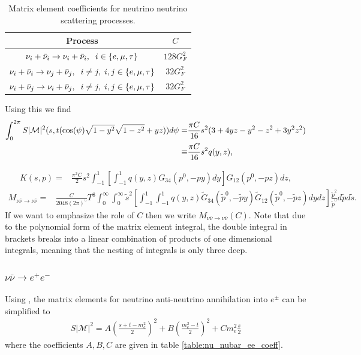 \begin{table}[ht]
\centering 
\begin{tabular}{|c|c|}
\hline
Process &$C$  \\
\hline
$\nu_i+\bar\nu_i\rightarrow\nu_i+\bar\nu_i,\hspace{2mm} i\in\{e,\mu,\tau\}$& $128 G_F^2$\\
\hline
$\nu_i+\bar\nu_i\rightarrow\nu_j+\bar\nu_j,\hspace{2mm} i\neq j, \hspace{1mm} i,j\in\{e,\mu,\tau\}$& $32 G_F^2$\\
\hline
$\nu_i+\bar\nu_j\rightarrow\nu_i+\bar\nu_j,\hspace{2mm} i\neq j, \hspace{1mm} i,j\in\{e,\mu,\tau\}$& $32 G_F^2$\\
\hline
\end{tabular}
\caption{Matrix element coefficients for neutrino neutrino scattering processes.}
\label{table:nu_nubar_coeff}
\end{table}
Using this we find
 \begin{align}
\int_0^{2\pi} S |\mathcal{M}|^2 (s,t(\cos(\psi)\sqrt{1-y^2}\sqrt{1-z^2}+yz))d\psi=&\frac{\pi C}{16} s^2(3+4 yz-y^2-z^2+3y^2z^2)\notag\\
\equiv&\frac{\pi C}{16} s^2q(y,z),
\end{align}

\begin{align}
K(s,p)=&\frac{\pi^2C}{2}s^2\int_{-1}^1 \left[\int_{-1}^1q(y,z)G_{34}(p^0,-p y) dy\right] G_{12}(p^0,-p z)dz,
\end{align}
\begin{align}
M_{\nu\bar\nu\rightarrow\nu\bar\nu}=&\frac{C}{2048(2\pi)^5 }T^8\!\!\!\int_0^\infty\!\!\!\!\int_0^\infty\!\!\! \tilde{s}^2\left[\int_{-1}^1\!\int_{-1}^1q(y,z)\tilde{G}_{34}(\tilde p^0,-\tilde{p} y) \tilde{G}_{12}(\tilde p^0,-\tilde{p} z)dydz\right]\frac{\tilde{p}^2}{\tilde{p}^0}d\tilde{p}d\tilde{s}.
\end{align}
 If we want to emphasize the role of $C$ then we write $M_{\nu\bar\nu\rightarrow\nu\bar\nu}(C)$. Note that due to the polynomial form of the matrix element integral, the double integral in brackets breaks into a linear combination of products of one dimensional integrals, meaning that the nesting of integrals is only three deep.

\subsubsection{$\nu\bar{\nu}\rightarrow e^+e^-$}\label{nu_nubar_int}
Using , the matrix elements for neutrino anti-neutrino annihilation into $e^\pm$ can be simplified to
\begin{align}
S|\mathcal{M}|^2=A\left(\frac{s+t-m_e^2}{2}\right)^2+B\left(\frac{m_e^2-t}{2}\right)^2+Cm_e^2\frac{s}{2}
\end{align}
where the coefficients $A,B,C$ are given in table \ref{table:nu_nubar_ee_coeff}.

